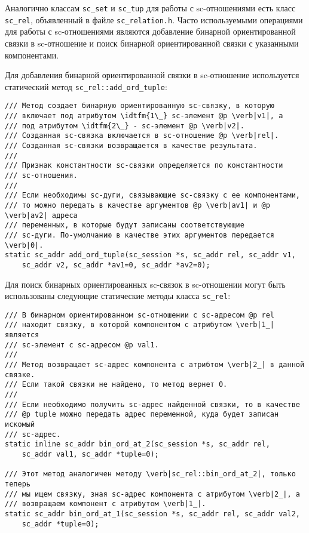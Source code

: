 Аналогично классам \lstinline|sc_set| и \lstinline|sc_tup| для работы
с sc-отношениями есть класс \lstinline|sc_rel|, объявленный в файле
\verb|sc_relation.h|. Часто используемыми операциями для работы с
sc-отношениями являются добавление бинарной ориентированной связки в
sc-отношение и поиск бинарной ориентированной связки с указанными
компонентами.

Для добавления бинарной ориентированной связки в sc-отношение
используется статический метод \lstinline|sc_rel::add_ord_tuple|:

\begin{lstlisting}[texcl]
/// Метод создает бинарную ориентированную sc-связку, в которую
/// включает под атрибутом \idtfm{1\_} sc-элемент @p \verb|v1|, а
/// под атрибутом \idtfm{2\_} - sc-элемент @p \verb|v2|.
/// Созданная sc-связка включается в sc-отношение @p \verb|rel|.
/// Созданная sc-связки возвращается в качестве результата.
///
/// Признак константности sc-связки определяется по константности
/// sc-отношения.
///
/// Если необходимы sc-дуги, связывающие sc-связку с ее компонентами,
/// то можно передать в качестве аргументов @p \verb|av1| и @p \verb|av2| адреса
/// переменных, в которые будут записаны соответствующие
/// sc-дуги. По-умолчанию в качестве этих аргументов передается \verb|0|.
static sc_addr add_ord_tuple(sc_session *s, sc_addr rel, sc_addr v1,
    sc_addr v2, sc_addr *av1=0, sc_addr *av2=0);
\end{lstlisting}

Для поиск бинарных ориентированных sc-связок в sc-отношении могут быть
использованы следующие статические методы класса \lstinline|sc_rel|:

\begin{lstlisting}[texcl]
/// В бинарном ориентированном sc-отношении с sc-адресом @p rel
/// находит связку, в которой компонентом с атрибутом \verb|1_| является
/// sc-элемент с sc-адресом @p val1.
///
/// Метод возвращает sc-адрес компонента с атрибтом \verb|2_| в данной связке.
/// Если такой связки не найдено, то метод вернет 0.
///
/// Если необходимо получить sc-адрес найденной связки, то в качестве
/// @p tuple можно передать адрес переменной, куда будет записан искомый
/// sc-адрес.
static inline sc_addr bin_ord_at_2(sc_session *s, sc_addr rel,
    sc_addr val1, sc_addr *tuple=0);

/// Этот метод аналогичен методу \verb|sc_rel::bin_ord_at_2|, только теперь
/// мы ищем связку, зная sc-адрес компонента с атрибутом \verb|2_|, а
/// возвращаем компонент с атрибутом \verb|1_|.
static sc_addr bin_ord_at_1(sc_session *s, sc_addr rel, sc_addr val2,
    sc_addr *tuple=0);
\end{lstlisting}

